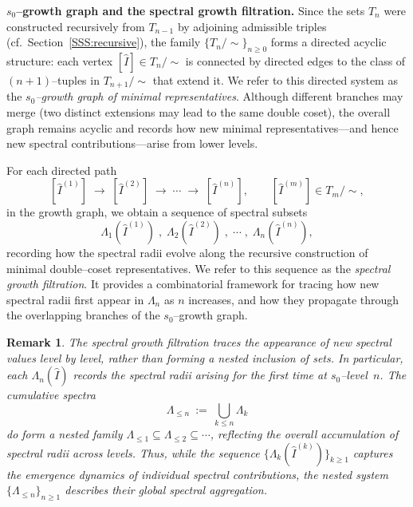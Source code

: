 \documentclass[11pt]{amsart}
\numberwithin{equation}{section}
\newtheorem{rem}[thm]{Remark}
\begin{document}
\medskip
\noindent \textbf{$s_0$--growth graph and the spectral growth filtration.} Since the sets $T_n$ were constructed recursively
from $T_{n-1}$ by adjoining admissible triples
(cf.\ Section~\ref{SSS:recursive}),
the family $\{T_n/\!\sim\}_{n\ge0}$ forms a directed acyclic structure:
each vertex $[\widehat I]\in T_n/\!\sim$ is connected by directed edges
to the class of $(n\!+\!1)$--tuples in $T_{n+1}/\!\sim$ that extend it.
We refer to this directed system as the
\emph{$s_0$--growth graph of minimal representatives}.
Although different branches may merge
(two distinct extensions may lead to the same double coset),
the overall graph remains acyclic and records how new
minimal representatives---and hence new spectral contributions---arise
from lower levels.

\medskip
For each directed path
\[
[\widehat I^{(1)} ]\;\longrightarrow\;
[\widehat I^{(2)} ]\;\longrightarrow\;
\cdots \;\longrightarrow\;
[\widehat I^{(n)}],
\qquad
[\widehat I^{(m)}]\in T_m/\!\sim,
\]
in the growth graph, we obtain a sequence of
spectral subsets
\[
\Lambda_1(\widehat I^{(1)}) \;,\;
\Lambda_{2}(\widehat I^{(2)}) \;,\;
\cdots \;,\;
\Lambda_n(\widehat I^{(n)}),
\]
recording how the spectral radii evolve along the
recursive construction of minimal double--coset representatives.
We refer to this sequence as the
\emph{spectral growth filtration}.
It provides a combinatorial framework for tracing how
new spectral radii first appear in $\Lambda_n$ as $n$ increases,
and how they propagate through the overlapping branches
of the $s_0$--growth graph.

\begin{rem}
The spectral growth filtration traces the appearance of
new spectral values level by level, rather than forming
a nested inclusion of sets.
In particular, each $\Lambda_n(\widehat I)$ records
the spectral radii arising \emph{for the first time} at $s_0$--level~$n$.
The cumulative spectra \[ \Lambda_{\leq n}\ :=\ \bigcup_{k\le n} \Lambda_k\]
do form a nested family
$\Lambda_{\le1}\subseteq\Lambda_{\le2}\subseteq\cdots$,
reflecting the overall accumulation of spectral radii
across levels.
Thus, while the sequence
$\{\Lambda_k(\widehat I^{(k)})\}_{k\ge1}$ captures the
\emph{emergence dynamics} of individual spectral contributions,
the nested system $\{\Lambda_{\le n}\}_{n\ge1}$
describes their global spectral aggregation.
\end{rem}
\end{document}
